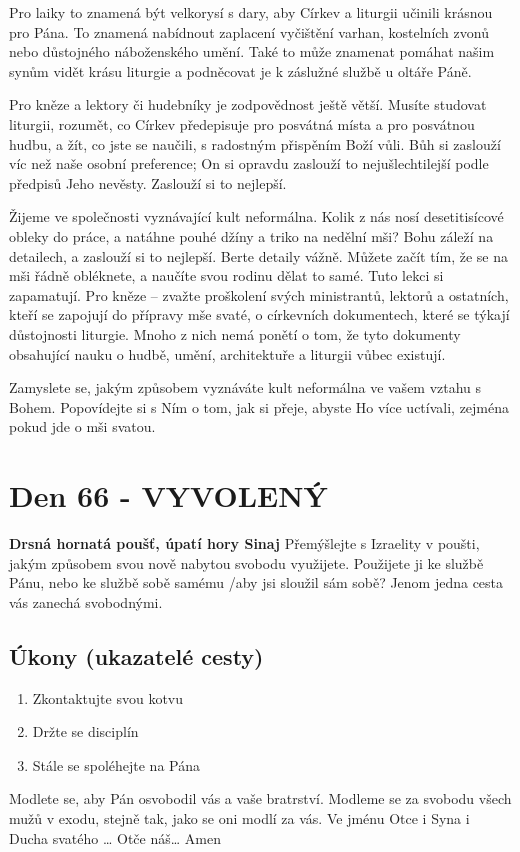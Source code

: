 \documentclass[11pt]{article}
\newcommand{\zacatekDesatyTyden}{
\textbf{Drsná hornatá poušť, úpatí hory Sinaj} \newline 
Přemýšlejte s Izraelity v poušti, jakým způsobem svou nově nabytou svobodu využijete. Použijete ji ke službě Pánu, nebo ke službě sobě samému /aby jsi sloužil sám sobě? Jenom jedna cesta vás zanechá svobodnými.

\subsection*{Úkony (ukazatelé cesty)}
\begin{enumerate}
  \item Zkontaktujte svou kotvu
  \item Držte se disciplín
  \item Stále se spoléhejte na Pána
\end{enumerate}
Modlete se, aby Pán osvobodil vás a vaše bratrství. \newline
Modleme se za svobodu všech mužů v exodu, stejně tak, jako se oni modlí za vás.\newline
Ve jménu Otce i Syna i Ducha svatého …  Otče náš… Amen
}
\begin{document}
Pro laiky to znamená být velkorysí s dary, aby Církev a liturgii učinili krásnou pro Pána. To znamená nabídnout
zaplacení vyčištění varhan, kostelních zvonů nebo důstojného náboženského umění. Také to může znamenat pomáhat
našim synům vidět krásu liturgie a podněcovat je k záslužné službě u oltáře Páně.

Pro kněze a lektory či hudebníky je zodpovědnost ještě větší. Musíte studovat liturgii, rozumět, co Církev předepisuje
pro posvátná místa a pro posvátnou hudbu, a žít, co jste se naučili, s radostným přispěním Boží vůli. Bůh si zaslouží
víc než naše osobní preference; On si opravdu zaslouží to nejušlechtilejší podle předpisů Jeho nevěsty. Zaslouží si to
nejlepší.

Žijeme ve společnosti vyznávající kult neformálna. Kolik z nás nosí desetitisícové obleky do práce, a natáhne pouhé
džíny a triko na nedělní mši? Bohu záleží na detailech, a zaslouží si to nejlepší. Berte detaily vážně. Můžete začít tím,
že se na mši řádně obléknete, a naučíte svou rodinu dělat to samé. Tuto lekci si zapamatují. Pro kněze – zvažte
proškolení svých ministrantů, lektorů a ostatních, kteří se zapojují do přípravy mše svaté, o církevních dokumentech,
které se týkají důstojnosti liturgie. Mnoho z nich nemá ponětí o tom, že tyto dokumenty obsahující nauku o hudbě,
umění, architektuře a liturgii vůbec existují.

Zamyslete se, jakým způsobem vyznáváte kult neformálna ve vašem vztahu s Bohem. Popovídejte si s Ním o tom, jak
si přeje, abyste Ho více uctívali, zejména pokud jde o mši svatou.




\newpage
\section{Den 66 - VYVOLENÝ}
\zacatekDesatyTyden
\end{document}
